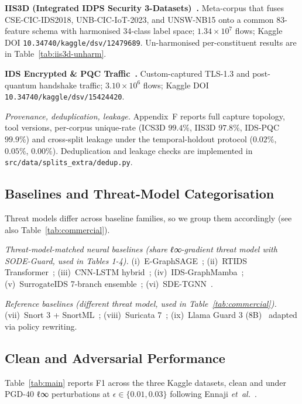 \documentclass{ieeeaccess}
\begin{document}
\textbf{IIS3D (Integrated IDPS Security 3-Datasets)~\cite{ds_iis3d}.}
Meta-corpus that fuses CSE-CIC-IDS2018, UNB-CIC-IoT-2023, and
UNSW-NB15 onto a common 83-feature schema with harmonised 34-class
label space; $1.34\times 10^7$ flows; Kaggle DOI
\texttt{10.34740/kaggle/dsv/12479689}. Un-harmonised per-constituent
results are in Table~\ref{tab:iis3d-unharm}.

\textbf{IDS Encrypted \& PQC Traffic~\cite{ds_pqcids}.} Custom-captured
TLS-1.3 and post-quantum handshake traffic; $3.10\times 10^6$ flows;
Kaggle DOI \texttt{10.34740/kaggle/dsv/15424420}.

\emph{Provenance, deduplication, leakage.} Appendix~F reports full
capture topology, tool versions, per-corpus unique-rate
(ICS3D $99.4\%$, IIS3D $97.8\%$, IDS-PQC $99.9\%$) and cross-split
leakage under the temporal-holdout protocol
($0.02\%$, $0.05\%$, $0.00\%$). Deduplication and leakage checks are
implemented in \texttt{src/data/splits\_extra/dedup.py}.

\subsection{Baselines and Threat-Model Categorisation}\label{subsec:baselines}
Threat models differ across baseline families, so we group them
accordingly (see also Table~\ref{tab:commercial}).

\emph{Threat-model-matched neural baselines (share ℓ∞-gradient threat
model with SODE-Guard, used in Tables 1-4).}
(i)~E-GraphSAGE~\cite{lo2022egraphsage};
(ii)~RTIDS Transformer~\cite{wu2022rtids};
(iii)~CNN-LSTM hybrid~\cite{halbouni2022cnnlstm};
(iv)~IDS-GraphMamba~\cite{mosaiyebzadeh2025graphmamba};
(v)~SurrogateIDS 7-branch ensemble~\cite{robustidps_repo};
(vi)~SDE-TGNN~\cite{robustidps_repo}.

\emph{Reference baselines (different threat model, used in
Table~\ref{tab:commercial}).}
(vii)~Snort 3 + SnortML~\cite{snort3};
(viii)~Suricata 7~\cite{suricata7};
(ix)~Llama Guard 3 (8B)~\cite{llamaguard3} adapted via policy
rewriting.

\subsection{Clean and Adversarial Performance}\label{subsec:clean}
Table~\ref{tab:main} reports F1 across the three Kaggle datasets,
clean and under PGD-40 ℓ∞ perturbations at $\epsilon\in\{0.01,0.03\}$
following Ennaji \textit{et~al.}~\cite{ennaji2024advsurvey}.
\end{document}
